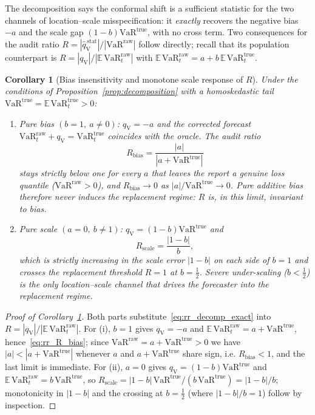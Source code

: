 \documentclass[11pt]{article}
\newtheorem{corollary}[theorem]{Corollary}
\newcommand{\VaR}{\mathrm{VaR}}
\newcommand{\E}{\mathbb{E}}
\newcommand{\1}{\boldsymbol{1}}
\newcommand{\qVstat}{\hat{q}_{\scriptscriptstyle\mathrm{V}}^{\,\mathrm{stat}}}
\newcommand{\qV}{q_{\scriptscriptstyle\mathrm{V}}}          %
\begin{document}
The decomposition says the conformal shift is a sufficient statistic for the
two channels of location--scale misspecification: it \emph{exactly} recovers
the negative bias $-a$ and the scale gap $(1-b)\VaR^{\mathrm{true}}$, with no
cross term. Two consequences for the audit ratio
$R=|\qVstat|/|\VaR^{\mathrm{raw}}|$ follow directly; recall that its population
counterpart is $R=|\qV|/|\E\,\VaR_t^{\mathrm{raw}}|$ with
$\E\,\VaR_t^{\mathrm{raw}}=a+b\,\E\,\VaR_t^{\mathrm{true}}$.

\begin{corollary}[Bias insensitivity and monotone scale response of $R$]
\label{cor:rr_R_response}
Under the conditions of Proposition~\ref{prop:decomposition} with a
homoskedastic tail $\VaR^{\mathrm{true}}=\E\,\VaR_t^{\mathrm{true}}>0$:
\begin{enumerate}[label=(\roman*),leftmargin=2.2em]
\item \emph{Pure bias} $(b=1,\ a\ne 0)$: $\qV=-a$ and the corrected forecast
$\VaR_t^{\mathrm{raw}}+\qV=\VaR_t^{\mathrm{true}}$ coincides with the oracle.
The audit ratio
\begin{equation}
\label{eq:rr_R_bias}
R_{\mathrm{bias}}=\frac{|a|}{|a+\VaR^{\mathrm{true}}|}
\end{equation}
stays strictly below one for every $a$ that leaves the report a genuine loss
quantile ($\VaR^{\mathrm{raw}}>0$), and $R_{\mathrm{bias}}\to 0$ as
$|a|/\VaR^{\mathrm{true}}\to 0$. Pure additive bias therefore never induces the
replacement regime: $R$ is, in this limit, invariant to bias.
\item \emph{Pure scale} $(a=0,\ b\ne 1)$: $\qV=(1-b)\VaR^{\mathrm{true}}$ and
\begin{equation}
\label{eq:rr_R_scale}
R_{\mathrm{scale}}=\frac{|1-b|}{b},
\end{equation}
which is strictly increasing in the scale error $|1-b|$ on each side of $b=1$
and crosses the replacement threshold $R=1$ at $b=\tfrac12$. Severe
under-scaling ($b<\tfrac12$) is the only location--scale channel that drives the
forecaster into the replacement regime.
\end{enumerate}
\end{corollary}

\begin{proof}[Proof of Corollary~\ref{cor:rr_R_response}]
Both parts substitute~\eqref{eq:rr_decomp_exact} into
$R=|\qV|/|\E\,\VaR_t^{\mathrm{raw}}|$. For (i), $b=1$ gives $\qV=-a$ and
$\E\,\VaR_t^{\mathrm{raw}}=a+\VaR^{\mathrm{true}}$, hence~\eqref{eq:rr_R_bias};
since $\VaR^{\mathrm{raw}}=a+\VaR^{\mathrm{true}}>0$ we have
$|a|<|a+\VaR^{\mathrm{true}}|$ whenever $a$ and $a+\VaR^{\mathrm{true}}$ share
sign, i.e. $R_{\mathrm{bias}}<1$, and the last limit is immediate. For (ii),
$a=0$ gives $\qV=(1-b)\VaR^{\mathrm{true}}$ and
$\E\,\VaR_t^{\mathrm{raw}}=b\,\VaR^{\mathrm{true}}$, so
$R_{\mathrm{scale}}=|1-b|\,\VaR^{\mathrm{true}}/(b\,\VaR^{\mathrm{true}})
=|1-b|/b$; monotonicity in $|1-b|$ and the crossing at $b=\tfrac12$ (where
$|1-b|/b=1$) follow by inspection.
\end{proof}
\end{document}
